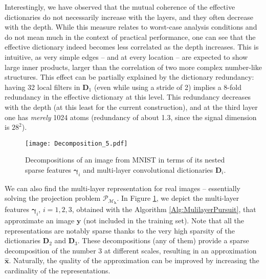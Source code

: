 \documentclass[10pt,journal]{IEEEtran}
\def\x{{\mathbf x}}
\def\y{{\mathbf y}}
\def\D{{\mathbf D}}
\def\M{{\mathcal{M}}}
\def\P{{\mathcal{P}}}
\def\gama{{\boldsymbol \gamma}}
\def\lamda{{\boldsymbol \lambda}}
\def\PM{{\P_{\M_\lamda}}}
\theoremstyle{plain}
\theoremstyle{definition}
\begin{document}
Interestingly, we have observed that the mutual coherence of the effective dictionaries do not necessarily increase with the layers, and they often decrease with the depth.
While this measure relates to worst-case analysis conditions and do not mean much in the context of practical performance, one can see that the effective dictionary indeed becomes less correlated as the depth increases. This is intuitive, as very simple edges -- and at every location -- are expected to show large inner products, larger than the correlation of two more complex number-like structures. This effect can be partially explained by the dictionary redundancy: having 32 local filters in $\D_1$ (even while using a stride of 2) implies a 8-fold redundancy in the effective dictionary at this level. This redundancy decreases with the depth (at this least for the current construction), and at the third layer one has \emph{merely} 1024 atoms (redundancy of about 1.3, since the signal dimension is $28^2$).


\begin{figure}
	\begin{center}
		\texttt{[image: Decomposition\_5.pdf]}
		\caption{Decompositions of an image from MNIST in terms of its nested sparse features $\gama_i$ and multi-layer convolutional dictionaries $\D_i$.}
		\label{fig:NumberDecomposition}
	\end{center}
\end{figure}
We can also find the multi-layer representation for real images -- essentially solving the projection problem $\PM$. In Figure \ref{fig:NumberDecomposition}, we depict the multi-layer features $\gama_i$, $i = 1,2,3$, obtained with the Algorithm \ref{Alg:MulilayerPursuit}, that approximate an image $\y$ (not included in the training set). Note that all the representations are notably sparse thanks to the very high sparsity of the dictionaries $\D_2$ and $\D_3$. These decompositions (any of them) provide a sparse decomposition of the number 3 at different scales, resulting in an approximation $\hat{\x}$. Naturally, the quality of the approximation can be improved by increasing the cardinality of the representations.

\end{document}

